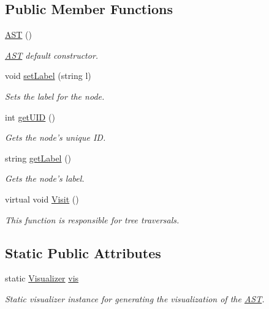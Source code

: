 \subsection*{Public Member Functions}
\begin{DoxyCompactItemize}
\item 
\hyperlink{classAST_afd378ca7cb3049d6293e8597d31d758d}{A\-S\-T} ()
\begin{DoxyCompactList}\small\item\em \hyperlink{classAST}{A\-S\-T} default constructor. \end{DoxyCompactList}\item 
void \hyperlink{classAST_a71d680856e95ff89f55d5311a552eba6}{set\-Label} (string l)
\begin{DoxyCompactList}\small\item\em Sets the label for the node. \end{DoxyCompactList}\item 
int \hyperlink{classAST_ab7a5b1d9f1c2de0d98deb356f724a42c}{get\-U\-I\-D} ()
\begin{DoxyCompactList}\small\item\em Gets the node's unique I\-D. \end{DoxyCompactList}\item 
string \hyperlink{classAST_aee029be902fffc927d16ccb03eb922ad}{get\-Label} ()
\begin{DoxyCompactList}\small\item\em Gets the node's label. \end{DoxyCompactList}\item 
virtual void \hyperlink{classAST_a5828cc86f2c4f1a0aeab6d7069e8fd82}{Visit} ()
\begin{DoxyCompactList}\small\item\em This function is responsible for tree traversals. \end{DoxyCompactList}\end{DoxyCompactItemize}
\subsection*{Static Public Attributes}
\begin{DoxyCompactItemize}
\item 
\hypertarget{classAST_aca9e6637209b31e03a09c0d42f29bdfa}{static \hyperlink{classVisualizer}{Visualizer} \hyperlink{classAST_aca9e6637209b31e03a09c0d42f29bdfa}{vis}}\label{classAST_aca9e6637209b31e03a09c0d42f29bdfa}

\begin{DoxyCompactList}\small\item\em Static visualizer instance for generating the visualization of the \hyperlink{classAST}{A\-S\-T}. \end{DoxyCompactList}\end{DoxyCompactItemize}
